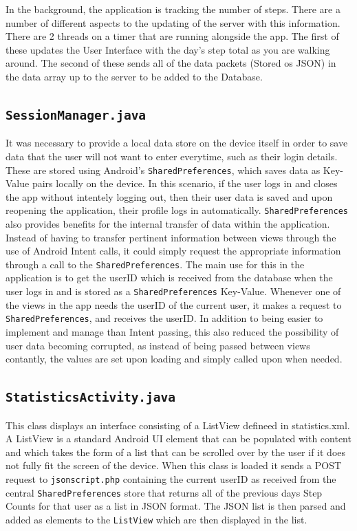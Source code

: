 \documentclass{l4proj}
\begin{document}
In the background, the application is tracking the number of steps. There are a number of different aspects to the updating of the server with this information. There are 2 threads on a timer that are running alongside the app. The first of these updates the User Interface with the day's step total as you are walking around. The second of these sends all of the data packets (Stored os JSON) in the data array up to the server to be added to the Database. 

\subsection{\texttt{SessionManager.java}}

It was necessary to provide a local data store on the device itself in order to save data that the user will not want to enter everytime, such as their login details. These are stored using Android's \texttt{SharedPreferences}, which saves data as Key-Value pairs locally on the device. In this scenario, if the user logs in and closes the app without intentely logging out, then their user data is saved and upon reopening the application, their profile logs in automatically. \texttt{SharedPreferences} also provides benefits for the internal transfer of data within the application. Instead of having to transfer pertinent information between views through the use of Android Intent calls, it could simply request the appropriate information through a call to the \texttt{SharedPreferences}. The main use for this in the application is to get the userID which is received from the database when the user logs in and is stored as a \texttt{SharedPreferences} Key-Value. Whenever one of the views in the app needs the userID of the current user, it makes a request to \texttt{SharedPreferences}, and receives the userID. In addition to being easier to implement and manage than Intent passing, this also reduced the possibility of user data becoming corrupted, as instead of being passed between views contantly, the values are set upon loading and simply called upon when needed.

\subsection{\texttt{StatisticsActivity.java}}

This class displays an interface consisting of a ListView defineed in statistics.xml. A ListView is a standard Android UI element that can be populated with content and which takes the form of a list that can be scrolled over by the user if it does not fully fit the screen of the device. When this class is loaded it sends a POST request to \texttt{jsonscript.php} containing the current userID as received from the central \texttt{SharedPreferences} store that returns all of the previous days Step Counts for that user as a list in JSON format. The JSON list is then parsed and added as elements to the \texttt{ListView} which are then displayed in the list.
\end{document}
